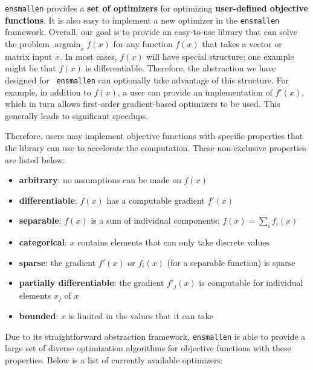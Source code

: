 \documentclass{article}
\DeclareMathOperator{\argminright}{argmin}   %
\begin{document}
{\tt ensmallen} provides a {\bf set of optimizers} for
optimizing {\bf user-defined objective functions}.  It is also easy to implement a
new optimizer in the {\tt ensmallen} framework.  Overall, our goal is to provide
an easy-to-use library that can solve the problem
$\argminright_{x} f(x)$
for any function $f(x)$ that takes a vector or matrix input $x$.
In most cases, $f(x)$ will have special structure; one example might be that
$f(x)$ is differentiable.  Therefore, the abstraction we have designed for {\tt
ensmallen} can optionally take advantage of this structure.  For example, in
addition to $f(x)$, a user can provide an implementation of $f'(x)$, which in
turn allows first-order gradient-based optimizers to be used.  This generally
leads to significant speedups.

Therefore, users may implement objective functions with specific properties that
the library can use to accelerate the computation.  These non-exclusive
properties are listed below:

\vspace*{-0.3em}
\begin{itemize} \itemsep -1pt
  \item {\bf arbitrary}: no assumptions can be made on $f(x)$
  \item {\bf differentiable}: $f(x)$ has a computable gradient $f'(x)$
  \item {\bf separable}: $f(x)$ is a sum of individual components: $f(x) =
\sum_{i} f_i(x)$
  \item {\bf categorical}: $x$ contains elements that can only take discrete
values
  \item {\bf sparse}: the gradient $f'(x)$ or $f_i(x)$ (for a separable
function) is sparse
  \item {\bf partially differentiable}: the gradient $f'_j(x)$ is computable for
individual elements $x_j$ of $x$
  \item {\bf bounded}: $x$ is limited in the values that it can take
\end{itemize}
\vspace*{-0.3em}

Due to its straightforward abstraction framework, {\tt ensmallen} is able to
provide a large set of diverse optimization algorithms for objective functions
with these properties.  Below is a list of currently available optimizers:
\end{document}
